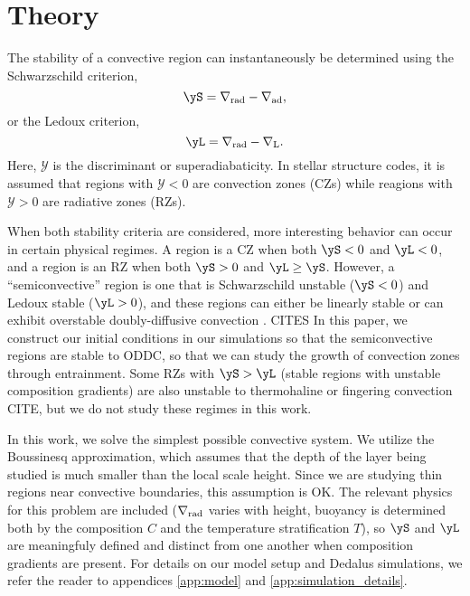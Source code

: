 \section{Theory}
\label{sec:theory}
The stability of a convective region can instantaneously be determined using the Schwarzschild criterion,
\begin{equation}
    \yS = \gradrad - \gradad,
\end{equation}
or the Ledoux criterion,
\begin{equation}
    \yL = \gradrad - \gradL.
\end{equation}
Here, $\mathcal{Y}$ is the discriminant \citep[e.g.,][sec.~2]{mesa4} or superadiabaticity.
In stellar structure codes, it is assumed that regions with $\mathcal{Y} < 0$ are convection zones (CZs) while reagions with $\mathcal{Y} > 0$ are radiative zones (RZs).

When both stability criteria are considered, more interesting behavior can occur in certain physical regimes.
A region is a CZ when both $\yS < 0$ and $\yL < 0$, and a region is an RZ when both $\yS > 0$ and $\yL \geq \yS$.
However, a ``semiconvective'' region is one that is Schwarzschild unstable ($\yS < 0$) and Ledoux stable ($\yL > 0$), and these regions can either be linearly stable or can exhibit overstable doubly-diffusive convection \citep[ODDC, see][chapter 2]{garaud_2018}. CITES
In this paper, we construct our initial conditions in our simulations so that the semiconvective regions are stable to ODDC, so that we can study the growth of convection zones through entrainment.
Some RZs with $\yS > \yL$ (stable regions with unstable composition gradients) are also unstable to thermohaline or fingering convection \citep[see][chapter 3]{garaud_2018} CITE, but we do not study these regimes in this work.

In this work, we solve the simplest possible convective system.
We utilize the Boussinesq approximation, which assumes that the depth of the layer being studied is much smaller than the local scale height.
Since we are studying thin regions near convective boundaries, this assumption is OK.
The relevant physics for this problem are included ($\nabla_{\rm{rad}}$ varies with height, buoyancy is determined both by the composition $C$ and the temperature stratification $T$), so $\yS$ and $\yL$ are meaningfuly defined and distinct from one another when composition gradients are present.
For details on our model setup and Dedalus simulations, we refer the reader to appendices \ref{app:model} and \ref{app:simulation_details}.


